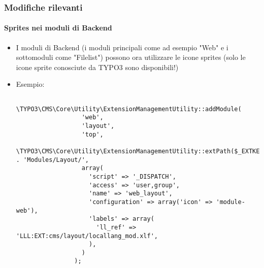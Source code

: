 \begin{frame}[fragile]
	\frametitle{Modifiche rilevanti}
	\framesubtitle{Sprites nei moduli di Backend}

	\lstset{basicstyle=\tiny\ttfamily}

	\begin{itemize}

		\item I moduli di Backend (i moduli principali come ad esempio "Web" e i sottomoduli come
			"Filelist") possono ora utilizzare le icone sprites\newline
			\small
				(solo le icone sprite conosciute da TYPO3 sono disponibili!)
			\normalsize

		\item Esempio:

			\begin{lstlisting}
				\TYPO3\CMS\Core\Utility\ExtensionManagementUtility::addModule(
				  'web',
				  'layout',
				  'top',
				  \TYPO3\CMS\Core\Utility\ExtensionManagementUtility::extPath($_EXTKEY) . 'Modules/Layout/',
				  array(
				    'script' => '_DISPATCH',
				    'access' => 'user,group',
				    'name' => 'web_layout',
				    'configuration' => array('icon' => 'module-web'),
				    'labels' => array(
				      'll_ref' => 'LLL:EXT:cms/layout/locallang_mod.xlf',
				    ),
				  )
				);
			\end{lstlisting}

	\end{itemize}

\end{frame}



